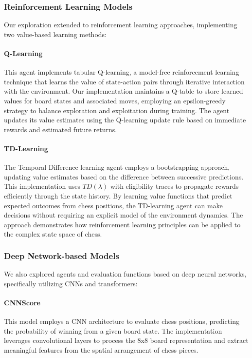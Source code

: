 \documentclass[journal, a4paper]{IEEEtran}
\begin{document}
\subsubsection{Reinforcement Learning Models}
Our exploration extended to reinforcement learning approaches, implementing two value-based learning methods:

\paragraph{Q-Learning} This agent implements tabular Q-learning, a model-free reinforcement learning technique that learns the value of state-action pairs through iterative interaction with the environment. Our implementation maintains a Q-table to store learned values for board states and associated moves, employing an epsilon-greedy strategy to balance exploration and exploitation during training. The agent updates its value estimates using the Q-learning update rule based on immediate rewards and estimated future returns.

\paragraph{TD-Learning} The Temporal Difference learning agent employs a bootstrapping approach, updating value estimates based on the difference between successive predictions. This implementation uses $TD(\lambda)$ with eligibility traces to propagate rewards efficiently through the state history. By learning value functions that predict expected outcomes from chess positions, the TD-learning agent can make decisions without requiring an explicit model of the environment dynamics. The approach demonstrates how reinforcement learning principles can be applied to the complex state space of chess.

\subsubsection{Deep Network-based Models}
We also explored agents and evaluation functions based on deep neural networks, specifically utilizing CNNs and transformers:

\paragraph{CNNScore} This model employs a CNN architecture to evaluate chess positions, predicting the probability of winning from a given board state. The implementation leverages convolutional layers to process the 8x8 board representation and extract meaningful features from the spatial arrangement of chess pieces.
\end{document}

